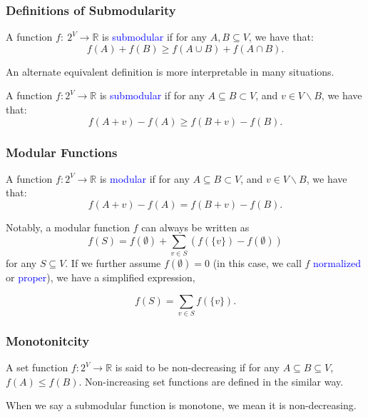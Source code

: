 \documentclass{beamer}
\newcommand{\emRed}[1][]{\textcolor{blue} #1}
\newcommand{\bbR}{\mathbb{R}}
\begin{document}
\begin{frame}
\frametitle{Definitions of Submodularity}
\begin{definition}
  \label{def:sub-concave}
  A function $f:~2^V \rightarrow \bbR$ is \emRed{submodular} if for any $A, B \subseteq V$, we have that:
  \begin{equation}
    \label{eq:sub-concave}
    f(A) + f(B) \geq f(A \cup B) + f(A \cap B).
  \end{equation}
\end{definition}

An alternate equivalent definition is more interpretable in many situations.

\begin{definition}
  \label{def:sub-diminishing}
  A function $f: 2^V \rightarrow \bbR$ is \emRed{submodular} if for any $A \subseteq B \subset V$, and $v \in V\backslash B$, we have that:
  \begin{equation}
    \label{eq:sub-diminishing}
    f(A + v) - f(A) \geq f(B + v) - f(B).
  \end{equation}
\end{definition}

\end{frame}


\begin{frame}
\frametitle{Modular Functions}
\begin{definition}[Modularity]
  \label{def:modular}
  A function $f: 2^V \rightarrow \bbR$ is \emRed{modular} if for any $A \subseteq B \subset V$, and $v \in V\backslash B$, we have that:
  \begin{equation}
    \label{eq:modular}
    f(A + v) - f(A) = f(B + v) - f(B).
  \end{equation}
\end{definition}
Notably, a modular function $f$ can always be written as
$$f(S) = f(\emptyset) + \sum_{v\in S} \left( f(\{v\}) - f(\emptyset) \right)$$
for any $S \subseteq V$. If we further assume $f(\emptyset) = 0$ (in this case, we call $f$ \emRed{normalized} or \emRed{proper}), we have a simplified expression,

$$f(S) = \sum_{v\in S} f(\{v\}).$$

\end{frame}

\begin{frame}
\frametitle{Monotonitcity}
\begin{definition}[Monotonitcity]
  A set function $f: 2^V \rightarrow  \bbR$ is said to be non-decreasing if for any $A\subseteq B \subseteq V$, $f(A) \leq f(B)$. Non-increasing set functions are defined in the similar way.
\end{definition}
When we say a submodular function is monotone, we mean it is non-decreasing.
\end{frame}
\end{document}
